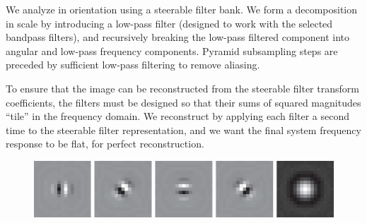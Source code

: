 
We analyze in orientation using a steerable filter bank.  We form a
decomposition in scale by introducing a low-pass filter (designed to
work with the selected bandpass filters), and recursively breaking the
low-pass filtered component into angular and low-pass frequency
components.   Pyramid subsampling steps are preceded by sufficient
low-pass filtering to remove aliasing.

To ensure that the image can be reconstructed from the steerable
filter transform coefficients, the filters must be designed so that
their sums of squared magnitudes ``tile'' in the frequency domain.  We
reconstruct by applying each filter a second time to the steerable
filter representation, and we want the final system frequency response
to be flat, for perfect reconstruction.

\begin{figure}[h!]
	\centerline{
		\includegraphics[width=0.80\linewidth]{figures/pyramids/steerable_pyr_sp3Filters.eps}
	}
\end{figure}


